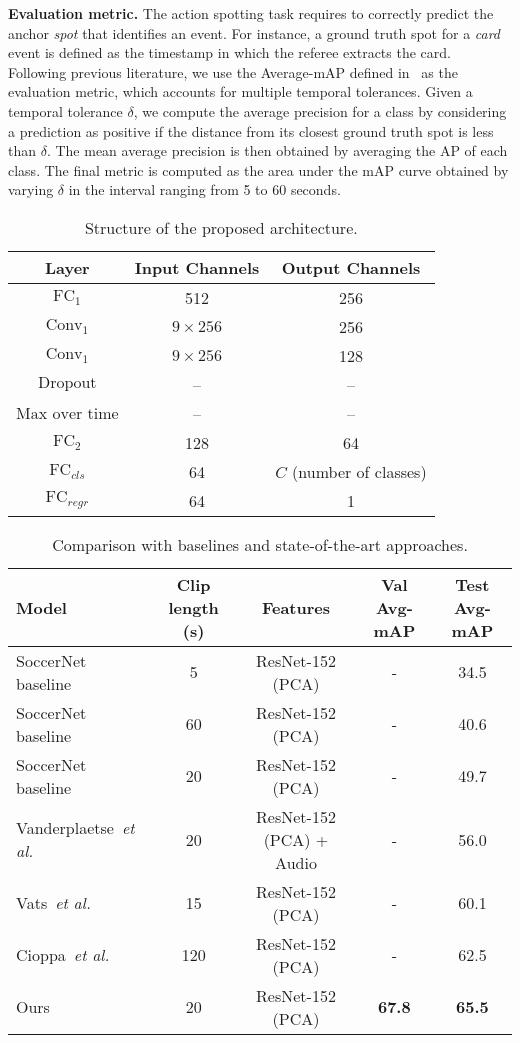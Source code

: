 \documentclass[a4paper,conference]{IEEEtran}
\newcommand{\tit}[1]{\smallbreak\noindent\textbf{#1.}}
\def \etal {\emph{et al.}}
\begin{document}
\tit{Evaluation metric}
The action spotting task requires to correctly predict the anchor \textit{spot} that identifies an event. For instance, a ground truth spot for a \textit{card} event is defined as the timestamp in which the referee extracts the card. Following previous literature, we use the Average-mAP defined in~\cite{giancola2018soccernet} as the evaluation metric, which accounts for multiple temporal tolerances. 
Given a temporal tolerance $\delta$, we compute the average precision for a class by considering a prediction as positive if the distance from its closest ground truth spot is less than $\delta$. The mean average precision is then obtained by averaging the AP of each class. The final metric is computed as the area under the mAP curve obtained by varying $\delta$ in the interval ranging from 5 to 60 seconds.
 
\begin{table}[t]
\centering
\caption{Structure of the proposed architecture.}
\begin{tabular}{ccc}
\toprule 
Layer & Input Channels & Output Channels \\
\midrule
$\text{FC}_1$ & 512 & 256 \\
$\text{Conv}_1$ & $9 \times 256$ & 256 \\
$\text{Conv}_1$ & $9 \times 256$ & 128 \\
$\text{Dropout}$ & -- & -- \\
$\text{Max over time}$ & -- & -- \\
$\text{FC}_2$ & 128 & 64 \\
$\text{FC}_{cls}$ & 64 & $C$ (number of classes) \\
$\text{FC}_{regr}$ & 64 & 1 \\
\bottomrule
\end{tabular}
\label{tab:channels}
\end{table}

\begin{table*}[t]
\centering
\caption{Comparison with baselines and state-of-the-art approaches.}
\begin{tabular}{lcccc}
\toprule 
Model & Clip length (s) & Features & Val Avg-mAP & Test Avg-mAP \\
\midrule
SoccerNet baseline~\cite{giancola2018soccernet} & 5 & ResNet-152 (PCA) & - & 34.5 \\
SoccerNet baseline~\cite{giancola2018soccernet} & 60 & ResNet-152 (PCA) & - & 40.6 \\
SoccerNet baseline~\cite{giancola2018soccernet} & 20 & ResNet-152 (PCA) & - & 49.7 \\
Vanderplaetse~\etal~\cite{vanderplaetse2020improved} & 20 & ResNet-152 (PCA) + Audio & - & 56.0 \\
Vats~\etal~\cite{vats2020event} & 15 & ResNet-152 (PCA) & - & 60.1 \\
Cioppa~\etal~\cite{cioppa2020context} & 120 & ResNet-152 (PCA) & - & 62.5 \\
\midrule
Ours & 20 & ResNet-152 (PCA) & \textbf{67.8} & \textbf{65.5} \\
\bottomrule
\end{tabular}
\label{tab:sota}
\end{table*}
\end{document}
